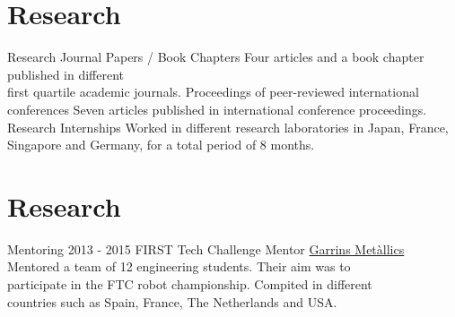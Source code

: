 \documentclass[letterpaper]{DS_class_file} %
\begin{document}
    \vspace{-1mm}


    \section{Research}

    \begin{twenty} %
        \twentyitem
        {Research}
        {}
        {Journal Papers / Book Chapters}
        {}
        {Four articles and a book chapter published in different \\ first quartile academic journals.}
        {}
        \twentyitem
        {}
        {}
        {Proceedings of peer-reviewed international conferences}
        {}
        {Seven articles published in international conference proceedings.}
        {}
        \twentyitem
        {}
        {}
        {Research Internships}
        {}
        {Worked in different research laboratories in Japan, France,\\Singapore and Germany, for a total period of 8 months.}
        {}
    \end{twenty}


\vspace{-1mm}


\section{Research}

\begin{twenty} %
	\twentyitem
	{Mentoring}
	{2013 - 2015}
	{FIRST Tech Challenge Mentor}
	{\href{https://twitter.com/garrinsmetalics?lang=ca}{Garrins Met\`{a}l\cdot lics}}
	{Mentored a team of 12 engineering students. Their aim was to \\participate in the FTC robot championship. Compited in different \\countries such as Spain, France, The Netherlands and USA.}
	{}
	\\
\end{twenty}
\end{document}

